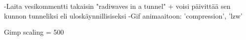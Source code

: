-Laita vesikommentti takaisin "radiwaves in a tunnel" + voisi päivittää sen kunnon tunneliksi eli uloskäynnillisiseksi
-Gif animaaitoon: 'compression', 'lzw'

Gimp scaling = 500 

